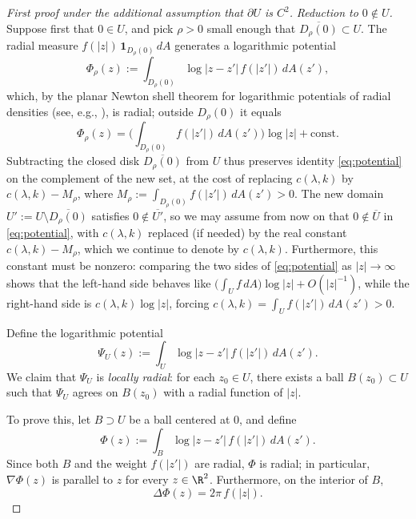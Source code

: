 \begin{proof}[First proof under the additional assumption that $\partial U$ is $C^2$]
\medskip

\noindent\emph{Reduction to $0\notin U$.}\quad
Suppose first that $0\in U$, and pick $\rho>0$ small enough that
$\overline{D_\rho(0)}\subset U$. The radial measure
$f(|z|)\,\mathbf{1}_{D_\rho(0)}\,dA$ generates a logarithmic potential
\[
\Phi_\rho(z):=\int_{D_\rho(0)} \log|z-z'|\, f(|z'|)\,dA(z'),
\]
which, by the planar Newton shell theorem for logarithmic potentials of
radial densities (see, e.g., \cite[Ch.~2]{Isakov}), is radial; outside
$D_\rho(0)$ it equals
\[
\Phi_\rho(z)=\Big(\int_{D_\rho(0)}f(|z'|)\,dA(z')\Big)\log|z|+\text{const}.
\]
Subtracting the closed disk $\overline{D_\rho(0)}$ from $U$ thus preserves
identity \eqref{eq:potential} on the complement of the new set, at the
cost of replacing $c(\lambda,k)$ by $c(\lambda,k)-M_\rho$, where
$M_\rho:=\int_{D_\rho(0)}f(|z'|)\,dA(z')>0$. The new domain
$U':=U\setminus\overline{D_\rho(0)}$ satisfies
$0\notin \overline{U'}$, so we may assume from now on that
$0\notin \overline{U}$ in \eqref{eq:potential}, with $c(\lambda,k)$
replaced (if needed) by the real constant $c(\lambda,k)-M_\rho$, which
we continue to denote by $c(\lambda,k)$. Furthermore, this constant must
be nonzero: comparing the two sides of \eqref{eq:potential} as
$|z|\to\infty$ shows that the left-hand side behaves like
$\big(\int_U f\,dA\big)\log|z|+O(|z|^{-1})$, while the right-hand side
is $c(\lambda,k)\log|z|$, forcing
$c(\lambda,k)=\int_U f(|z'|)\,dA(z')>0$.

\medskip

Define the logarithmic potential
\[
\Psi_U(z):=\int_U \log|z-z'|\, f(|z'|)\,dA(z').
\]
We claim that $\Psi_U$ is \emph{locally radial}: for each $z_0\in U$,
there exists a ball $B(z_0)\subset U$ such that $\Psi_U$ agrees on
$B(z_0)$ with a radial function of $|z|$.

To prove this, let $B\supset U$ be a ball centered at $0$, and define
\[
\Phi(z):=\int_B \log|z-z'|\, f(|z'|)\,dA(z').
\]
Since both $B$ and the weight $f(|z'|)$ are radial, $\Phi$ is radial; in
particular, $\nabla \Phi(z)$ is parallel to $z$ for every $z\in \R^2$.
Furthermore, on the interior of $B$,
\[
\Delta \Phi(z)=2\pi\, f(|z|).
\]


\end{proof}
